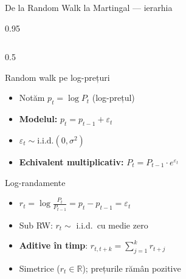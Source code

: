 \documentclass[9pt, aspectratio=169, t]{beamer}
\begin{document}
\begin{frame}[shrink=15]{De la Random Walk la Martingal --- ierarhia}
\begin{cminipage}{0.95\textwidth}
\begin{columns}[T]
\begin{column}{0.5\textwidth}
\begin{block}{Random walk pe log-prețuri}
\begin{itemize}\setlength{\itemsep}{0pt}
    \item Notăm $p_t = \log P_t$ (log-prețul)
    \item \textbf{Modelul:} $p_t = p_{t-1} + \varepsilon_t$
    \item $\varepsilon_t \sim \text{i.i.d.}(0, \sigma^2)$
    \item \textbf{Echivalent multiplicativ:} $P_t = P_{t-1} \cdot e^{\varepsilon_t}$
\end{itemize}
\end{block}

\begin{block}{Log-randamente}
\begin{itemize}\setlength{\itemsep}{0pt}
    \item $r_t = \log\frac{P_t}{P_{t-1}} = p_t - p_{t-1} = \varepsilon_t$
    \item Sub RW: $r_t \sim$ i.i.d.\ cu medie zero
    \item \textbf{Aditive în timp}: $r_{t,t+k} = \sum_{j=1}^{k} r_{t+j}$
    \item Simetrice ($r_t \in \mathbb{R}$); prețurile rămân pozitive
\end{itemize}
\end{block}


\end{column}
\end{columns}
\end{cminipage}
\end{frame}
\end{document}
